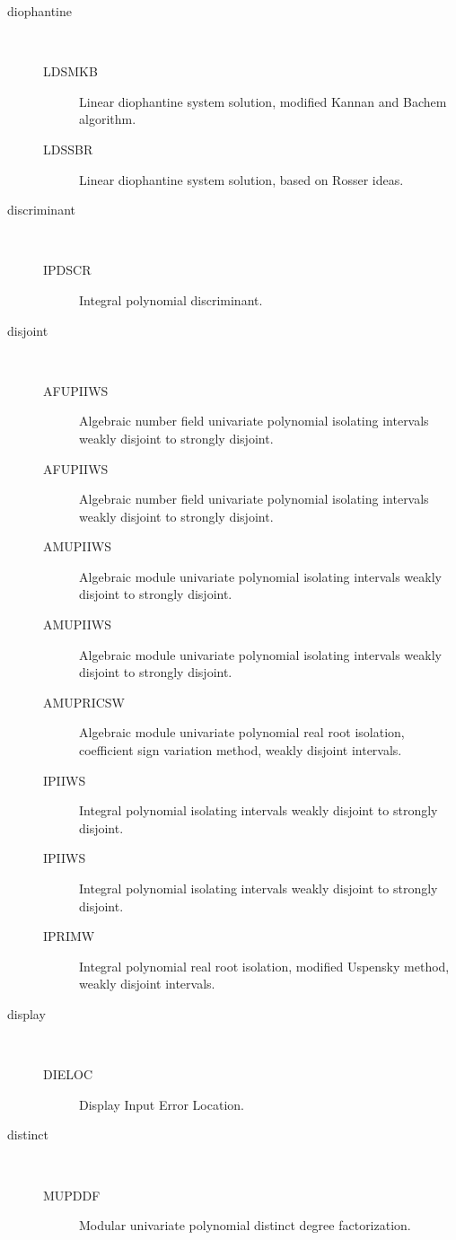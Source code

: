 \begin{description}
\item[diophantine] \ \ 
  \begin{description}
  \item[LDSMKB]  Linear diophantine system solution, modified Kannan and
    Bachem algorithm.
  \item[LDSSBR]  Linear diophantine system solution, based on Rosser ideas.
  \end{description}
\item[discriminant] \ \ 
  \begin{description}
  \item[IPDSCR]  Integral polynomial discriminant.
  \end{description}
\item[disjoint] \ \ 
  \begin{description}
  \item[AFUPIIWS]  Algebraic number field univariate polynomial isolating
    intervals weakly disjoint to strongly disjoint.
  \item[AFUPIIWS]  Algebraic number field univariate polynomial isolating
    intervals weakly disjoint to strongly disjoint.
  \item[AMUPIIWS]  Algebraic module univariate polynomial isolating intervals
    weakly disjoint to strongly disjoint.
  \item[AMUPIIWS]  Algebraic module univariate polynomial isolating intervals
    weakly disjoint to strongly disjoint.
  \item[AMUPRICSW]  Algebraic module univariate polynomial real root
    isolation, coefficient sign variation method, weakly disjoint intervals.
  \item[IPIIWS]  Integral polynomial isolating intervals weakly disjoint to
    strongly disjoint.
  \item[IPIIWS]  Integral polynomial isolating intervals weakly disjoint to
    strongly disjoint.
  \item[IPRIMW]  Integral polynomial real root isolation, modified Uspensky
    method, weakly disjoint intervals.
  \end{description}
\item[display] \ \ 
  \begin{description}
  \item[DIELOC]  Display Input Error Location.
  \end{description}
\item[distinct] \ \ 
  \begin{description}
  \item[MUPDDF]  Modular univariate polynomial distinct degree factorization.

\end{description}
\end{description}
